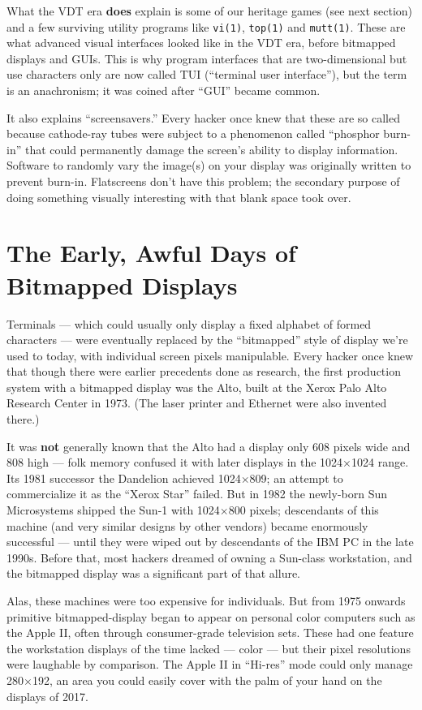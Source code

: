 \documentclass[10pt]{article}
\newcommand{\prog}[1]{\texttt{#1}}
\newcommand{\strong}[1]{\textbf{#1}}
\newcommand{\mc}{\small}
\newcommand{\acro}[1]{{\mc #1\spacefactor1000}}
\begin{document}
What the \acro{VDT} era \textbf{does} explain is some of our heritage games (see next section)
and a few surviving utility programs like \prog{vi(1)}, \prog{top(1)} and \prog{mutt(1)}. These are
what advanced visual interfaces looked like in the \acro{VDT} era, before bitmapped
displays and \acro{GUI}s. This is why program interfaces that are two-dimensional but
use characters only are now called \acro{TUI} (``terminal user interface''), but the
term is an anachronism; it was coined after ``\acro{GUI}'' became common.

It also explains ``screensavers.'' Every hacker once knew that these are so
called because cathode-ray tubes were subject to a phenomenon called ``phosphor
burn-in'' that could permanently damage the screen's ability to display
information. Software to randomly vary the image(s) on your display was
originally written to prevent burn-in. Flatscreens don't have this problem; the
secondary purpose of doing something visually interesting with that blank space
took over.

\section{The Early, Awful Days of Bitmapped Displays}
Terminals --- which could usually only display a fixed alphabet of formed
characters --- were eventually replaced by the ``bitmapped'' style of display we're
used to today, with individual screen pixels manipulable. Every hacker once
knew that though there were earlier precedents done as research, the first
production system with a bitmapped display was the Alto, built at the Xerox
Palo Alto Research Center in 1973. (The laser printer and Ethernet were also
invented there.)

It was \strong{not} generally known that the Alto had a display only 608 pixels wide and
808 high --- folk memory confused it with later displays in the 1024$\times$1024 range.
Its 1981 successor the Dandelion achieved 1024$\times$809; an attempt to commercialize
it as the ``Xerox Star'' failed. But in 1982 the newly-born Sun Microsystems
shipped the Sun-1 with 1024$\times$800 pixels; descendants of this machine (and very
similar designs by other vendors) became enormously successful --- until they
were wiped out by descendants of the \acro{IBM PC} in the late 1990s. Before that,
most hackers dreamed of owning a Sun-class workstation, and the bitmapped
display was a significant part of that allure.

Alas, these machines were too expensive for individuals. But from 1975 onwards
primitive bitmapped-display began to appear on personal color computers such as
the Apple II, often through consumer-grade television sets. These had one
feature the workstation displays of the time lacked --- color --- but their pixel
resolutions were laughable by comparison. The Apple II in ``Hi-res'' mode could
only manage 280$\times$192, an area you could easily cover with the palm of your hand
on the displays of 2017.
\end{document}
